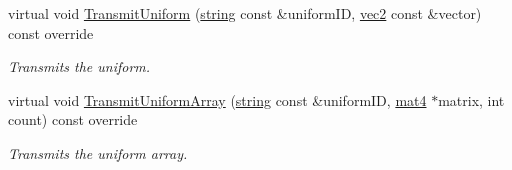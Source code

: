 \begin{DoxyCompactItemize}
virtual void \hyperlink{class_shader_a9abf3c1e4b53531bf60140b73ba327b2}{Transmit\+Uniform} (\hyperlink{_types_8h_ad453f9f71ce1f9153fb748d6bb25e454}{string} const \&uniform\+ID, \hyperlink{_types_8h_a43182e59794291f6ab00e51b160706c2}{vec2} const \&vector) const  override
\begin{DoxyCompactList}\small\item\em Transmits the uniform. \end{DoxyCompactList}\item 
virtual void \hyperlink{class_shader_a7a059841e4932d2ef457e59db5347885}{Transmit\+Uniform\+Array} (\hyperlink{_types_8h_ad453f9f71ce1f9153fb748d6bb25e454}{string} const \&uniform\+ID, \hyperlink{_types_8h_a2db59f395fe82a7394c6324956c265d8}{mat4} $\ast$matrix, int count) const  override
\begin{DoxyCompactList}\small\item\em Transmits the uniform array. \end{DoxyCompactList}\end{DoxyCompactItemize}
